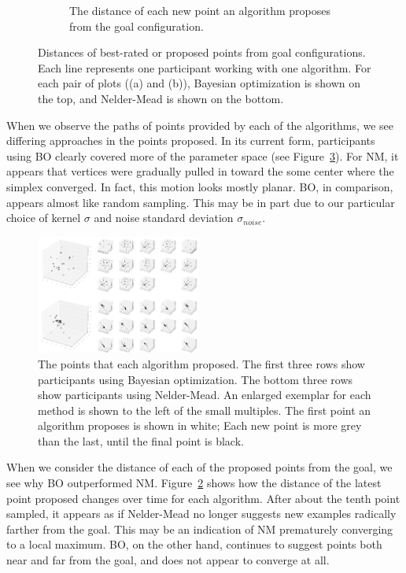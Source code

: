 \begin{figure}
\begin{subfigure}[b]{0.48\textwidth}
    \caption{%
      The distance of each new point an algorithm proposes from the goal configuration.
    }\label{fig:point_distances}
  \end{subfigure}
  \caption{%
    Distances of best-rated or proposed points from goal configurations.
    Each line represents one participant working with one algorithm.
    For each pair of plots ((a) and (b)),
    Bayesian optimization is shown on the top, and 
    Nelder-Mead is shown on the bottom.
  }
\end{figure}

When we observe the paths of points provided by each of the algorithms, we see differing approaches in the points proposed.
In its current form, participants using BO clearly covered more of the parameter space (see Figure~\ref{fig:coverage}).
For NM, it appears that vertices were gradually pulled in toward the some center where the simplex converged.
In fact, this motion looks mostly planar.
BO, in comparison, appears almost like random sampling.
This may be in part due to our particular choice of kernel $\sigma$ and noise standard deviation $\sigma_{noise}$.

\begin{figure}
  \centering
  \includegraphics[width=0.48\textwidth]{figures/scatters}
  \caption{%
    The points that each algorithm proposed.
    The first three rows show participants using Bayesian optimization.
    The bottom three rows show participants using Nelder-Mead.
    An enlarged exemplar for each method is shown to the left of the small multiples.
    The first point an algorithm proposes is shown in white;
    Each new point is more grey than the last, until the final point is black.
  }\label{fig:coverage}
\end{figure}

When we consider the distance of each of the proposed points from the goal, we see why BO outperformed NM\@.
Figure~\ref{fig:point_distances} shows how the distance of the latest point proposed changes over time for each algorithm.
After about the tenth point sampled, it appears as if Nelder-Mead no longer suggests new examples radically farther from the goal.
This may be an indication of NM prematurely converging to a local maximum.
BO, on the other hand, continues to suggest points both near and far from the goal, and does not appear to converge at all.

